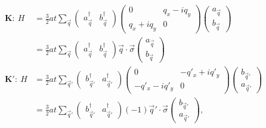 \begin{align*}
	\bm{K:} \ H&=\frac{3}{2} a t \sum_{\vec q} 
		\left( \begin{array}{cc} a^{\dagger}_{\vec{q}} & b^{\dagger}_{\vec{q}} \end{array} \right)
		\left( \begin{array}{cc}
			0              & q_x - i q_y\\
			q_x+i q_y      & 0                                                 \end{array} \right)
		\left( \begin{array}{c } a_{\vec{q}}           \\ b_{\vec{q}}          \end{array} \right) \\
	  &=\frac{3}{2} a t \sum_{\vec q}
		\left( \begin{array}{cc} a^{\dagger}_{\vec{q}} & b^{\dagger}_{\vec{q}} \end{array} \right)
		\vec{q} \cdot \vec{\sigma}
		\left( \begin{array}{c } a_{\vec{q}}           \\ b_{\vec{q}}          \end{array} \right) \\
	\bm{K':} \ H&=\frac{3}{2} a t \sum_{\vec q'} 
		\left( \begin{array}{cc} b^{\dagger}_{\vec{q}'} & a^{\dagger}_{\vec{q}'} \end{array} \right)
		\left( \begin{array}{cc}
			0              & -q'_x + i q'_y\\
			-q'_x-i q'_y     & 0                                                 \end{array} \right)
		\left( \begin{array}{c } b_{\vec{q}'}           \\ a_{\vec{q}'}          \end{array} \right) \\
	  &=\frac{3}{2} a t \sum_{\vec q'}
		\left( \begin{array}{cc} b^{\dagger}_{\vec{q}'} & a^{\dagger}_{\vec{q}'} \end{array} \right)
		(-1)\vec{q}' \cdot \vec{\sigma}
		\left( \begin{array}{c } b_{\vec{q}'}           \\ a_{\vec{q}'}          \end{array} \right), \\
\end{align*}
